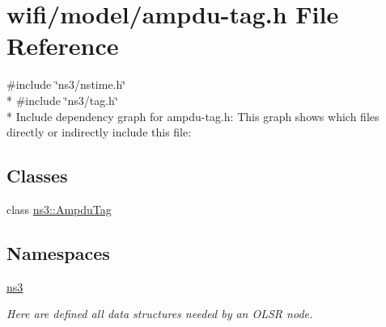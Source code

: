 \hypertarget{ampdu-tag_8h}{}\section{wifi/model/ampdu-\/tag.h File Reference}
\label{ampdu-tag_8h}
{\ttfamily \#include \char`\"{}ns3/nstime.\+h\char`\"{}}\\*
{\ttfamily \#include \char`\"{}ns3/tag.\+h\char`\"{}}\\*
Include dependency graph for ampdu-\/tag.h\+:
This graph shows which files directly or indirectly include this file\+:
\subsection*{Classes}
\begin{DoxyCompactItemize}
\item 
class \hyperlink{classns3_1_1AmpduTag}{ns3\+::\+Ampdu\+Tag}
\end{DoxyCompactItemize}
\subsection*{Namespaces}
\begin{DoxyCompactItemize}
\item 
 \hyperlink{namespacens3}{ns3}
\begin{DoxyCompactList}\small\item\em Here are defined all data structures needed by an O\+L\+SR node. \end{DoxyCompactList}\end{DoxyCompactItemize}
